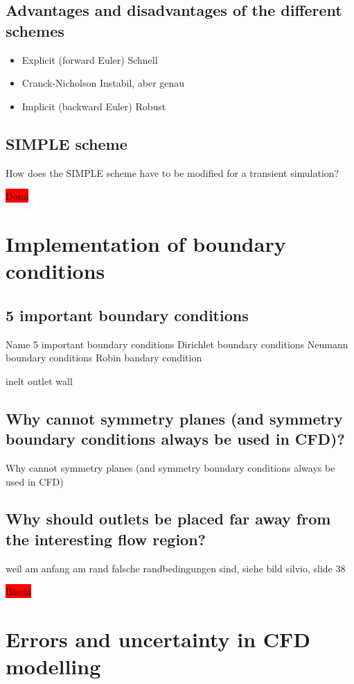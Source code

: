 \documentclass[a4paper]{scrartcl}
\begin{document}
\subsection{Advantages and disadvantages of the different schemes}
\begin{itemize}
\item Explicit (forward Euler)
Schnell

\item Cranck-Nicholson
Instabil, aber genau

\item Implicit (backward Euler)
Robust 
\end{itemize}
\subsection{SIMPLE scheme}
How does the SIMPLE scheme have to be modified for a transient
simulation?

\colorbox{red}{Domi}


\section{Implementation of boundary conditions}


\subsection{5 important boundary conditions}

 Name 5 important boundary
conditions Dirichlet boundary conditions
Neumann boundary conditions
Robin bandary  condition


inelt
outlet
wall



\subsection{Why cannot symmetry planes (and symmetry boundary conditions always
be used in CFD)?}
Why cannot symmetry planes (and symmetry boundary conditions always
be used in CFD)
\subsection{Why should outlets be placed far away from the interesting flow
region?}
 weil am anfang am rand falsche randbedingungen sind, siehe bild silvio,
slide 38

\colorbox{red}{Bischi}

\section{Errors and uncertainty in CFD modelling}
\end{document}
